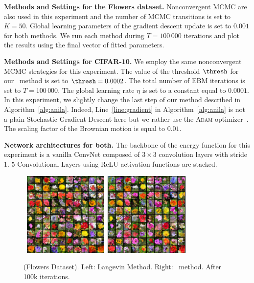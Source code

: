 \documentclass{article} %
\begin{document}
\medskip
\textbf{Methods and Settings for the Flowers dataset.}
Nonconvergent MCMC are also used in this experiment and the number of MCMC transitions is set to $K = 50$.
Global learning parameters of the gradient descent update is set to $0.001$ for both methods.
We run each method during $T = 100\,000$ iterations and plot the results using the final vector of fitted parameters.

\medskip
\textbf{Methods and Settings for CIFAR-10.}
We employ the same nonconvergent MCMC strategies for this experiment.
The value of the threshold $\thresh$ for our \algo\ method is set to $\thresh = 0.0002$.
The total number of EBM iterations is set to $T = 100\,000$.
The global learning rate $\eta$ is set to a constant equal to $0.0001$.
In this experiment, we slightly change the last step of our method described in Algorithm~\ref{alg:anila}.
Indeed, Line~\ref{line:gradient} in Algorithm~\ref{alg:anila} is not a plain Stochastic Gradient Descent here but we rather use the \textsc{Adam} optimizer~\cite{KB15}.
The scaling factor of the Brownian motion is equal to $0.01$.



\medskip
\textbf{Network architectures for both.} 
The backbone of the energy function for this experiment is a vanilla ConvNet composed of $3 \times 3$ convolution layers with stride $1$.
$5$ Convolutional Layers using ReLU activation functions are stacked.



\begin{figure}[t]
\begin{center}
        \mbox{
        \includegraphics[width=1.65in]{figs/flowerslangevin}
        \includegraphics[width=1.65in]{figs/flowersanila}
        }
\end{center}
	\caption{(Flowers Dataset). Left: Langevin Method. Right: \algo\ method. After 100k iterations.}
	\label{fig:flowers}
\end{figure}
\end{document}
